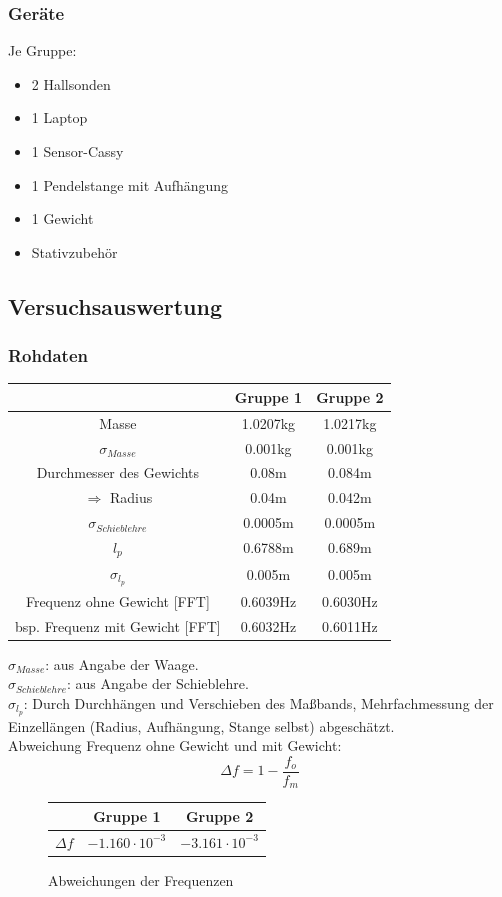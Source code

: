 \documentclass[12pt,a4paper]{article}
\begin{document}
\subsubsection{Geräte}
Je Gruppe:
\begin{itemize}
\item 2 Hallsonden
\item 1 Laptop
\item 1 Sensor-Cassy
\item 1 Pendelstange mit Aufhängung
\item 1 Gewicht
\item Stativzubehör
\end{itemize}
\subsection{Versuchsauswertung}

\subsubsection{Rohdaten}
\begin{center}
\begin{tabular}{c|c|c}
 & Gruppe 1 & Gruppe 2 \\ 
\hline
Masse & 1.0207kg & 1.0217kg \\ 
$\sigma_{Masse}$ & 0.001kg & 0.001kg \\ 
Durchmesser des Gewichts & 0.08m & 0.084m \\ 
$\Rightarrow$ Radius & 0.04m & 0.042m \\ 
$\sigma_{Schieblehre}$ & 0.0005m & 0.0005m \\ 
$l_p$ & 0.6788m & 0.689m \\ 
$\sigma_{l_p}$ & 0.005m & 0.005m \\ 
Frequenz ohne Gewicht [FFT] & 0.6039Hz & 0.6030Hz \\ 
bsp. Frequenz mit Gewicht [FFT] & 0.6032Hz & 0.6011Hz \\ 
\end{tabular} 
\end{center}
$\sigma_{Masse}$: aus Angabe der Waage.\\
$\sigma_{Schieblehre}$: aus Angabe der Schieblehre. \\
$\sigma_{l_p}$: Durch Durchhängen und Verschieben des Maßbands, Mehrfachmessung der Einzellängen (Radius, Aufhängung, Stange selbst) abgeschätzt.\\
Abweichung Frequenz ohne Gewicht und mit Gewicht:
\begin{equation}
\Delta f=1-\frac{f_o}{f_m}
\end{equation}
\begin{figure}[H]\centering
\begin{tabular}{c|c|c}
 & Gruppe 1 & Gruppe 2 \\ 
\hline
$\Delta f$ & $-1.160\cdot 10^{-3}$ & $-3.161\cdot 10^{-3}$ \\ 
\end{tabular} 
\caption{Abweichungen der Frequenzen}
\label{Abweichungen der Frequenzen}
\end{figure}
\newpage
\end{document}
